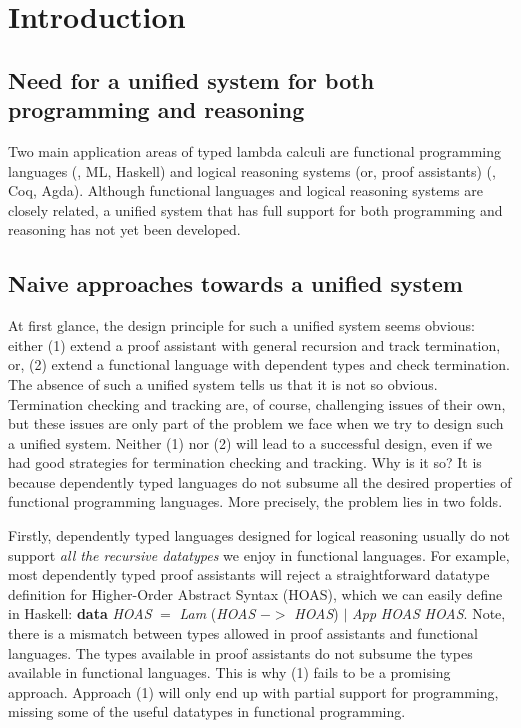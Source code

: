\section{Introduction}

\subsection{Need for a unified system for both programming and reasoning}

Two main application areas of typed lambda calculi are
functional programming languages (\eg, ML, Haskell) and
logical reasoning systems (or, proof assistants) (\eg, Coq, Agda).
Although functional languages and logical reasoning systems are closely related,
a unified system that has full support for both
programming and reasoning has not yet been developed.



\subsection{Naive approaches towards a unified system}
At first glance, the design principle for such a unified system seems obvious:
either
(1) extend a proof assistant with general recursion and track termination, or,
(2) extend a functional language with dependent types and check termination.
The absence of such a unified system tells us that it is not so obvious.
Termination checking and tracking are, of course, challenging issues
of their own, but these issues are only part of the problem we face
when we try to design such a unified system. Neither (1) nor (2) will
lead to a successful design, even if we had good strategies for
termination checking and tracking. Why is it so?
It is because dependently typed languages do not subsume
all the desired properties of functional programming languages.
More precisely, the problem lies in two folds.

Firstly, dependently typed languages designed for logical reasoning usually do
not support \emph{all the recursive datatypes} we enjoy in functional languages.
For example, most dependently typed proof assistants will reject
a straightforward datatype definition for Higher-Order Abstract Syntax (HOAS),
which we can easily define in Haskell:
\textbf{data} \textit{HOAS} $=$ \textit{Lam} (\textit{HOAS} $->$ \textit{HOAS})
                         $\mid$ \textit{App} \textit{HOAS} \textit{HOAS}.
Note, there is a mismatch between types allowed in proof assistants and
functional languages. The types available in proof assistants do not subsume
the types available in functional languages. This is why (1) fails to be
a promising approach. Approach (1) will only end up with partial support for
programming, missing some of the useful datatypes in functional programming.

